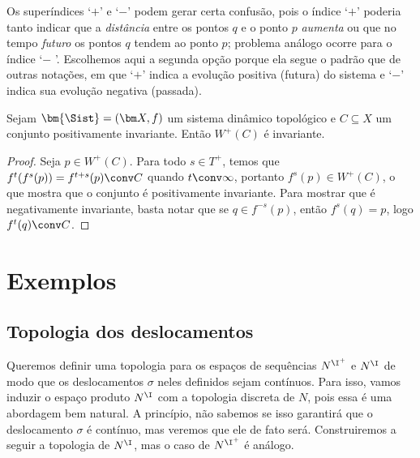 Os superíndices `$+$' e `$-$' podem gerar certa confusão, pois o índice `$+$' poderia tanto indicar que a \textit{distância} entre os pontos $q$ e o ponto $p$ \textit{aumenta} ou que no tempo \textit{futuro} os pontos $q$ tendem ao ponto $p$; problema análogo ocorre para o índice `$-$	'. Escolhemos aqui a segunda opção porque ela segue o padrão que de outras notações, em que `$+$' indica a evolução positiva (futura) do sistema e `$-$' indica sua evolução negativa (passada).

\begin{proposition}
Sejam $\bm{\Sist}=(\bm X,f)$ um sistema dinâmico topológico e $C \subseteq X$ um conjunto positivamente invariante. Então $W^+(C)$ é invariante.
\end{proposition}
\begin{proof}
Seja $p \in W^+(C)$. Para todo $s \in T^+$, temos que $f^t(f^s(p)) = f^{t+s}(p) \conv C$ quando $t \conv \infty$, portanto $f^s(p) \in W^+(C)$, o que mostra que o conjunto é positivamente invariante. Para mostrar que é negativamente invariante, basta notar que se $q \in f^{-s}(p)$, então $f^s(q)=p$, logo $f^t(q) \conv C$.
\end{proof}



\section{Exemplos}

\subsection{Topologia dos deslocamentos}

Queremos definir uma topologia para os espaços de sequências $N^{\I^+}$ e $N^\I$ de modo que os deslocamentos $\sigma$ neles definidos sejam contínuos. Para isso, vamos induzir o espaço produto $N^\I$ com a topologia discreta de $N$, pois essa é uma abordagem bem natural. A princípio, não sabemos se isso garantirá que o deslocamento $\sigma$ é contínuo, mas veremos que ele de fato será. Construiremos a seguir a topologia de $N^\I$, mas o caso de $N^{\I^+}$ é análogo.

